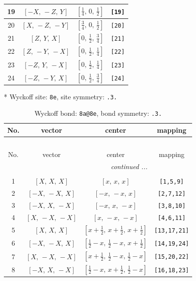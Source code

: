 \documentclass[fleqn,8pt]{jsarticle}
\begin{document}
\begin{longtable}{cccc}
19 & $\left[ - X,\, - Z,\, Y \right]$ & $\left[ \frac{1}{4},\, 0,\, \frac{1}{2} \right]$ & {\tt [19]} \\ \hline
20 & $\left[ X,\, - Z,\, - Y \right]$ & $\left[ \frac{3}{4},\, 0,\, \frac{1}{2} \right]$ & {\tt [20]} \\ \hline
21 & $\left[ Z,\, Y,\, X \right]$ & $\left[ 0,\, \frac{1}{2},\, \frac{3}{4} \right]$ & {\tt [21]} \\ \hline
22 & $\left[ Z,\, - Y,\, - X \right]$ & $\left[ 0,\, \frac{1}{2},\, \frac{1}{4} \right]$ & {\tt [22]} \\ \hline
23 & $\left[ - Z,\, Y,\, - X \right]$ & $\left[ 0,\, \frac{1}{2},\, \frac{1}{4} \right]$ & {\tt [23]} \\ \hline
24 & $\left[ - Z,\, - Y,\, X \right]$ & $\left[ 0,\, \frac{1}{2},\, \frac{3}{4} \right]$ & {\tt [24]} \\
\end{longtable}
* Wyckoff site: {\tt 8e}, site symmetry: {\tt .3.}
\renewcommand{\arraystretch}{1.2}
\begin{longtable}{cccc}
\caption{Wyckoff bond: {\tt 8a@8e}, bond symmetry: {\tt .3.}}
 \\
 \hline \hline
No. & vector & center & mapping \\ \hline \endfirsthead

\multicolumn{3}{l}{\tablename\ \thetable{}} \\
 \hline \hline
No. & vector & center & mapping \\ \hline \endhead

 \hline \hline
\multicolumn{3}{r}{\footnotesize\it continued ...} \\ \endfoot

 \hline \hline
\multicolumn{3}{r}{} \\ \endlastfoot

1 & $\left[ X,\, X,\, X \right]$ & $\left[ x,\, x,\, x \right]$ & {\tt [1,5,9]} \\ \hline
2 & $\left[ - X,\, - X,\, X \right]$ & $\left[ - x,\, - x,\, x \right]$ & {\tt [2,7,12]} \\ \hline
3 & $\left[ - X,\, X,\, - X \right]$ & $\left[ - x,\, x,\, - x \right]$ & {\tt [3,8,10]} \\ \hline
4 & $\left[ X,\, - X,\, - X \right]$ & $\left[ x,\, - x,\, - x \right]$ & {\tt [4,6,11]} \\ \hline
5 & $\left[ X,\, X,\, X \right]$ & $\left[ x + \frac{1}{2},\, x + \frac{1}{2},\, x + \frac{1}{2} \right]$ & {\tt [13,17,21]} \\ \hline
6 & $\left[ - X,\, - X,\, X \right]$ & $\left[ \frac{1}{2} - x,\, \frac{1}{2} - x,\, x + \frac{1}{2} \right]$ & {\tt [14,19,24]} \\ \hline
7 & $\left[ X,\, - X,\, - X \right]$ & $\left[ x + \frac{1}{2},\, \frac{1}{2} - x,\, \frac{1}{2} - x \right]$ & {\tt [15,20,22]} \\ \hline
8 & $\left[ - X,\, X,\, - X \right]$ & $\left[ \frac{1}{2} - x,\, x + \frac{1}{2},\, \frac{1}{2} - x \right]$ & {\tt [16,18,23]} \\
\end{longtable}
\end{document}
